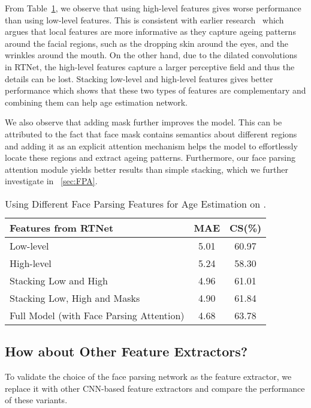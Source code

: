 From Table~\ref{tab:which-features}, we observe that using high-level features gives worse performance than using low-level features. This is consistent with earlier research~\cite{hanDemographicEstimationFace2015} which argues that local features are more informative as they capture ageing patterns around the facial regions, such as the dropping skin around the eyes, and the wrinkles around the mouth. On the other hand, due to the dilated convolutions in RTNet, the high-level features capture a larger perceptive field and thus the details can be lost. Stacking low-level and high-level features gives better performance which shows that these two types of features are complementary and combining them can help age estimation network. 

We also observe that adding mask further improves the model. This can be attributed to the fact that face mask contains semantics about different regions and adding it as an explicit attention mechanism helps the model to effortlessly locate these regions and extract ageing patterns. Furthermore, our face parsing attention module yields better results than simple stacking, which we further investigate in \sectionautorefname~\ref{sec:FPA}.
\begin{table}
    \caption{Using Different Face Parsing Features for Age Estimation on \imdbc.}
    \label{tab:which-features}
    \centering
    \begin{tabular}{l|c|c}
    \toprule
        Features from RTNet & MAE  & CS(\%)  \\ \hline
        Low-level &5.01 & 60.97 \\ 
        High-level &5.24 & 58.30 \\ 
        Stacking Low and High &4.96 & 61.01 \\ 
        Stacking Low, High and Masks&4.90 & 61.84 \\ \hline
        Full Model (with Face Parsing Attention) &4.68  &63.78 \\  
    \bottomrule
    \end{tabular}
\end{table}







\subsection{How about Other Feature Extractors?}
To validate the choice of the face parsing network as the feature extractor, we replace it with other CNN-based feature extractors and compare the performance of these variants. 

